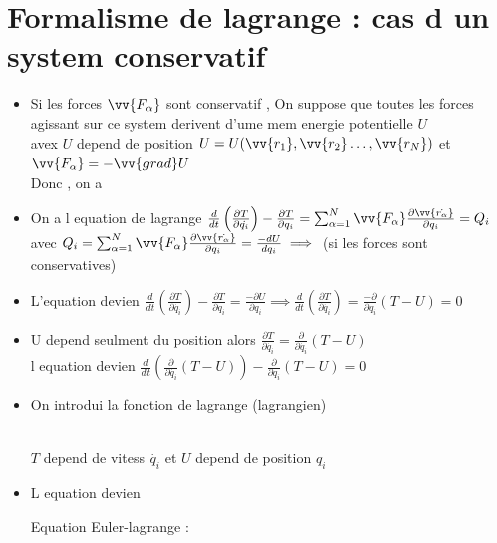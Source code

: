 \documentclass[12pt]{book}
\begin{document}
        \section{Formalisme de lagrange : cas d un system conservatif}
             \begin{itemize}
                \item Si les forces $\vv{F_\alpha}$ sont conservatif , On suppose que toutes les forces agissant sur ce system derivent d'ume mem energie potentielle $U$ \\
                    avex $U$ depend de position $U = U(\vv{r_1}, \vv{r_2}\ldots , \vv{r_N})$ et $\vv{F_\alpha}=-\vv{grad}U$ \\
                    Donc , on a 
                \item On a l equation de lagrange $\frac{d}{dt}\left( \frac{\partial T}{\partial \dot{q_i}} \right) - \frac{\partial T}{\partial q_i} = \sum^N_{\alpha = 1}\vv{F_\alpha}\frac{\partial\vv{\dot{r_\alpha}}}{\partial q_i} = Q_i$ \\
                    avec $Q_i =\sum^N_{\alpha = 1}\vv{F_\alpha}\frac{\partial\vv{\dot{r_\alpha}}}{\partial q_i} = \frac{-dU}{dq_i}\implies $ (si les forces sont conservatives)
                \item L'equation devien $\frac{d}{dt}\left( \frac{\partial T}{\partial \dot{q_i}} \right) - \frac{\partial T}{\partial q_i} = \frac{-\partial U}{\partial q_i} \implies \frac{d}{dt}\left( \frac{\partial T}{\partial \dot{q_i}} \right) = \frac{-\partial}{\partial q_i}(T-U) =0$ 
                \item U depend seulment du position alors $\frac{\partial T}{\partial \dot{q_i}} = \frac{\partial}{\partial \dot{q_i}}(T-U)$ \\
                    l equation devien $\frac{d}{dt}\left( \frac{\partial}{\partial \dot{q_i}}(T-U) \right) - \frac{\partial}{\partial q_i} (T-U) =0$
                \item On introdui la fonction de lagrange (lagrangien) \\
                    \begin{center}
                         \\
                        $T$ depend de vitess $\dot{q_i}$ et $U$ depend de position $q_i$
                    \end{center}
                \item L equation devien \\
                    \begin{center}
                        Equation Euler-lagrange : 
                    \end{center}
            \end{itemize}
\end{document}
